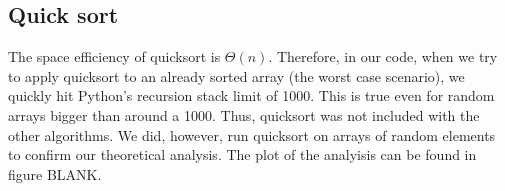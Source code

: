 \documentclass[letterpaper, 11pt]{article}
\begin{document}
\subsection{Quick sort}
The space efficiency of quicksort is \(\Theta(n)\). Therefore, in our code,
when we try to apply quicksort to an already sorted array (the worst case
scenario), we quickly hit Python's recursion stack limit of 1000. This is true
even for random arrays bigger than around a 1000. Thus, quicksort was not
included with the other algorithms. We did, however, run quicksort on arrays of
random elements to confirm our theoretical analysis. The plot of the analyisis
can be found in figure BLANK. 
\end{document}
